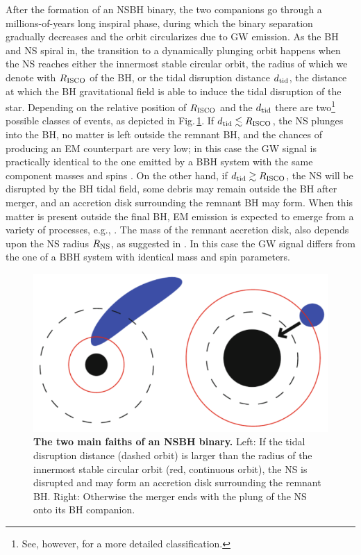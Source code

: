 \documentclass[binding=0.6cm, LaM]{sapthesis}
\begin{document}
        After the formation of an NSBH binary, the two companions go through a millions-of-years long inspiral phase,
        during which the binary separation gradually decreases and the orbit circularizes due to GW emission.
        As the BH and NS spiral in, the transition to a dynamically plunging orbit happens
        when the NS reaches either the innermost stable circular orbit, the radius of which we denote with $R_{\rm ISCO}$ of the BH, or the tidal disruption distance $d_{\rm tid}$,
        the distance at which the BH gravitational field is able to induce the tidal disruption of the star.
        Depending on the relative position of $R_{\rm ISCO}$ and the $d_{\rm tid}$ there are
        two\footnote{See, however, \cite{165} for a more detailed classification.} possible classes of events, as depicted in Fig.\,\ref{fig:nsbh}.
        If $d_{\rm tid} \lesssim R_{\rm ISCO}$, the NS plunges into the BH, no matter is left outside the remnant BH,
        and the chances of producing an EM counterpart are very low; in this case the GW signal is practically identical to the one emitted by a BBH system with the same component masses and spins \cite{163, 164, 165, 166, 167}.
        On the other hand, if $d_{\rm tid} \gtrsim R_{\rm ISCO}$, the NS will be disrupted by the BH tidal field, some debris may remain outside the BH after merger, and an accretion disk surrounding the remnant BH may form.
        When this matter is present outside the final BH, EM emission is expected to emerge from a variety of processes, e.g., \cite{169}.
        The mass of the remnant accretion disk, also depends upon the NS radius $R_{\rm NS}$, as suggested in \cite{168}.
        In this case the GW signal differs from the one of a BBH system with identical mass and spin parameters.
        \begin{figure}[!t]
          \label{nsbh}
          \includegraphics[scale=0.45]{nsbh}
          \centering
          \caption{{\bf The two main faiths of an NSBH binary.} Left: If the tidal disruption distance (dashed orbit) is larger than the radius of the innermost stable circular orbit (red, continuous orbit), the NS is disrupted and may form an accretion disk surrounding the remnant BH.  Right: Otherwise the merger ends with the plung of the NS onto its BH companion.}
          \label{fig:nsbh}
        \end{figure}
\end{document}
